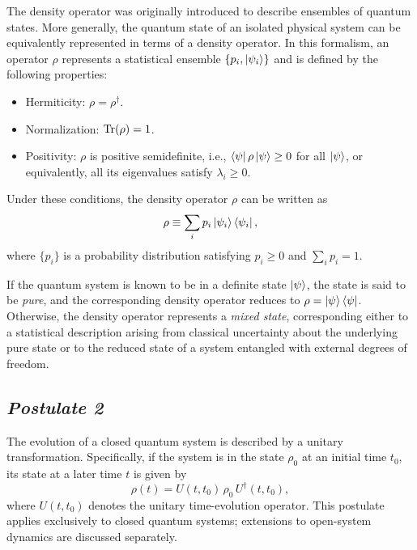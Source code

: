 The density operator was originally introduced to describe ensembles of quantum states. More generally, the quantum state of an isolated physical system can be equivalently represented in terms of a density operator. In this formalism, an operator $\rho$ represents a statistical ensemble $\{p_i, \ket{\psi_i}\}$ and is defined by the following properties:
\begin{itemize}
    \item[(1)] Hermiticity: $\rho = \rho^{\dagger}$.
    \item[(2)] Normalization: $\Tr(\rho) = 1$.
    \item[(3)] Positivity: $\rho$ is positive semidefinite, i.e., $\bra{\psi}\rho\ket{\psi} \geq 0$ for all $\ket{\psi}$, or equivalently, all its eigenvalues satisfy $\lambda_i \geq 0$.
\end{itemize}

Under these conditions, the density operator $\rho$ can be written as
\begin{equation}
    \rho \equiv \sum_i p_i \ket{\psi_i}\bra{\psi_i},
\end{equation}
where $\{p_i\}$ is a probability distribution satisfying $p_i \geq 0$ and $\sum_i p_i = 1$.

If the quantum system is known to be in a definite state $\ket{\psi}$, the state is said to be \textit{pure}, and the corresponding density operator reduces to $\rho = \ket{\psi}\bra{\psi}$. Otherwise, the density operator represents a \textit{mixed state}, corresponding either to a statistical description arising from classical uncertainty about the underlying pure state or to the reduced state of a system entangled with external degrees of freedom.

\subsection*{\small\textit{Postulate 2}}

The evolution of a closed quantum system is described by a unitary transformation. Specifically, if the system is in the state $\rho_0$ at an initial time $t_0$, its state at a later time $t$ is given by
\begin{equation}
    \label{eq:postulate2}
    \rho(t) = U(t,t_0)\, \rho_0 \, U^{\dagger}(t,t_0),
\end{equation}
where $U(t,t_0)$ denotes the unitary time-evolution operator. This postulate applies exclusively to closed quantum systems; extensions to open-system dynamics are discussed separately.

